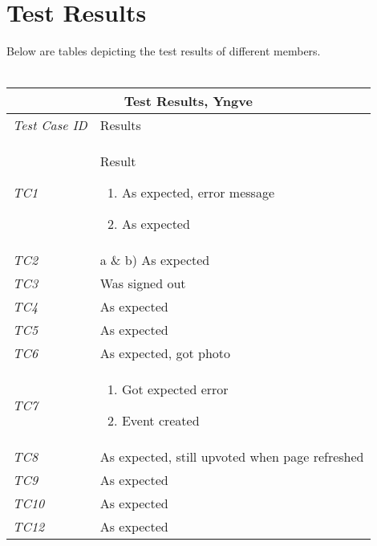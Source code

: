 \section{Test Results}
\label{chap:TestingResults}
%
Below are tables depicting the test results of different members. \\ \\
%
\begin{minipage}{\linewidth}
\setlength{\tabcolsep}{15pt}
\centering
{}
\begin{tabular}{ |l|p{70mm}| }
	\hline
	\multicolumn{2}{|c|}{\cellcolor{gray!25} \textbf{Test Results, Yngve}} \\
	\hline
	\it{\cellcolor{gray!25}Test Case ID} & {\cellcolor{gray!25} Results } \\
	\hline
	\it{\cellcolor{gray!25}TC1} & Result \begin{enumerate}[label=\alph*)]
	                                       \item As expected, error message
	                                       \item As expected
	                                     \end{enumerate}\\ \hline
	\it{\cellcolor{gray!25}TC2}  & a \& b) As expected \\ \hline
	\it{\cellcolor{gray!25}TC3} & Was signed out \\ \hline
	\it{\cellcolor{gray!25}TC4} & As expected \\ \hline
	\it{\cellcolor{gray!25}TC5} & As expected \\ \hline
	\it{\cellcolor{gray!25}TC6} & As expected, got photo \\ \hline
	\it{\cellcolor{gray!25}TC7} & \begin{enumerate}[label=\alph*)]
	                                \item Got expected error
	                                \item Event created
                                  \end{enumerate}\\ \hline
	\it{\cellcolor{gray!25}TC8} & As expected, still upvoted when page refreshed \\ \hline
	\it{\cellcolor{gray!25}TC9} & As expected \\ \hline
	\it{\cellcolor{gray!25}TC10} & As expected \\ \hline
	\it{\cellcolor{gray!25}TC12} & As expected \\ \hline

\end{tabular}
\end{minipage}
